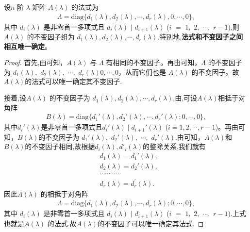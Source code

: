 \documentclass[../../main.tex]{subfiles}%
\begin{document}
\begin{corollary}\label{corollary:不变因子和法式相互唯一确定}
设$n$ 阶 $\lambda$-矩阵 $A(\lambda)$ 的法式为
\begin{align*}
\varLambda=\mathrm{diag}\{d_1(\lambda),d_2(\lambda),\cdots,d_r(\lambda),0,\cdots,0\},
\end{align*}
其中 $d_i(\lambda)$ 是非零首一多项式且 $d_i(\lambda)$ $\mid$ $ d_{i + 1}(\lambda)$ ($i$ $=$ $1,$ $2,$ $\cdots,$ $r - 1$),则 $A(\lambda)$ 的不变因子组为 $d_1(\lambda),d_2(\lambda),\cdots,d_r(\lambda)$.特别地,\textbf{法式和不变因子之间相互唯一确定}。
\end{corollary}
\begin{proof}

首先,由可知，$A(\lambda)$ 与 $\varLambda$ 有相同的不变因子。再由可知，$\varLambda$ 的不变因子为 $d_1(\lambda),$ $d_2(\lambda),$ $\cdots,$ $d_r(\lambda)0,\cdots,0$，从而它们也是 $A(\lambda)$ 的不变因子。故$A(\lambda)$的法式可以唯一确定其不变因子.

接着,设$A(\lambda)$ 的不变因子为 $d_1(\lambda),d_2(\lambda),\cdots,d_r(\lambda)$,由,可设$A(\lambda)$相抵于对角阵
\begin{align}
B(\lambda)=\mathrm{diag}\{d_1'(\lambda),d_2'(\lambda),\cdots,d_r'(\lambda);0,\cdots,0\},
\end{align}
其中$d_i'(\lambda)$是非零首一多项式且$d_i'(\lambda)\mid d_{i + 1}'(\lambda)$ ($i = 1,2,\cdots,r - 1$)。再由可知，$B(\lambda)$的不变因子为 $d_1'(\lambda),$ $d_2'(\lambda),$ $\cdots,$ $d_r'(\lambda)$.由可知，$A(\lambda)$和$B(\lambda)$的不变因子相同,故根据$d_i(\lambda),d'_i(\lambda)$的整除关系,我们就有
\begin{align*}
&d_1\left( \lambda \right) =d_1'(\lambda ),
\\
&d_2\left( \lambda \right) =d_2' (\lambda ),
\\
&\cdots \cdots \cdots \cdots 
\\
&d_r\left( \lambda \right) =d_{r}^{\prime}\left( \lambda \right) .
\end{align*}
因此$A(\lambda)$ 的相抵于对角阵
\begin{align*}
\varLambda=\mathrm{diag}\{d_1(\lambda),d_2(\lambda),\cdots,d_r(\lambda);0,\cdots,0\},
\end{align*}
其中 $d_i(\lambda)$ 是非零首一多项式且 $d_i(\lambda)$ $\mid$ $ d_{i + 1}(\lambda)$ ($i$ $=$ $1,$ $2,$ $\cdots,$ $r - 1$).上式也就是$A(\lambda)$ 的法式.故$A(\lambda)$的不变因子可以唯一确定其法式.

\end{proof}
\end{document}

